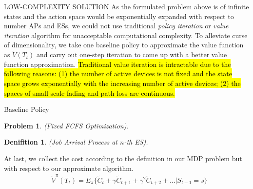 \documentclass[10pt, conference, letterpaper]{IEEEtran}
\newtheorem{definition}{Denifition}
\newtheorem{problem}{Problem}
\begin{document}
    \begin{section}{LOW-COMPLEXITY SOLUTION}
        \label{sec:algorithm}
        As the formulated problem above is of infinite states and the action space would be exponentially expanded with respect to number APs and ESs, we could not use traditional \emph{policy iteration} or \emph{value iteration} algorithm \cite{sutton1998introduction} for unacceptable computational complexity. To alleviate curse of dimensionality, we take one baseline policy to approximate the value function as $\tilde{V}(T_t)$ and carry out one-step iteration to come up with a better value function approximation.
        \hl{Traditional value iteration is intractable due to the following reasons: (1) the number of active devices is not fixed and the state space grows exponentially with the increasing number of active devices; (2) the spaces of small-scale fading and path-loss are continuous.}

        \begin{subsection}{Baseline Policy}
            \begin{problem}
                (Fixed FCFS Optimization).
            \end{problem}

            \begin{definition}
                (Job Arrival Process at $n$-th ES).
            \end{definition}

            At last, we collect the cost according to the definition in our MDP problem but with respect to our approximate algorithm.
            \begin{align}
                & \tilde{V}^{\pi}(T_t)
                \nonumber%
                = E_{\pi} \{ \tilde{C}_{t} + \gamma \tilde{C}_{t+1} + \gamma^2 \tilde{C}_{t+2} + \dots |S_{t-1}=s \}
            \end{align}
        \end{subsection}


\end{section}
\end{document}
